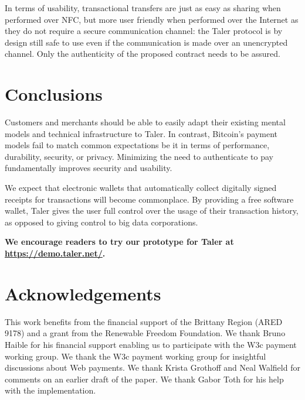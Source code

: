 \documentclass{llncs}
\begin{document}
In terms of usability, transactional
transfers are just as easy as sharing when performed over NFC, but
more user friendly when performed over the Internet as they do not
require a secure communication channel: the Taler protocol is by
design still safe to use even if the communication is made over an
unencrypted channel. Only the authenticity of the proposed contract
needs to be assured.



\section{Conclusions}

Customers and merchants should be able to easily adapt their existing
mental models and technical infrastructure to Taler.  In contrast,
Bitcoin's payment models fail to match common expectations be it in
terms of performance, durability, security, or privacy.  Minimizing
the need to authenticate to pay fundamentally improves security
and usability.

We expect that electronic wallets that automatically collect digitally
signed receipts for transactions will become commonplace.
By providing a free software wallet, Taler gives the user full control
over the usage of their
transaction history, as opposed to giving control to big data corporations.

\begin{center}
  \bf
We encourage readers to try our prototype for Taler
at \url{https://demo.taler.net/}.
\end{center}


\section*{Acknowledgements}

This work benefits from the financial support of the Brittany Region
(ARED 9178) and a grant from the Renewable Freedom Foundation.  We
thank Bruno Haible for his financial support enabling us to
participate with the W3c payment working group.  We thank the W3c
payment working group for insightful discussions about Web payments.
We thank Krista Grothoff and Neal Walfield for comments on an earlier
draft of the paper.  We thank Gabor Toth for his help with the
implementation.



\end{document}
